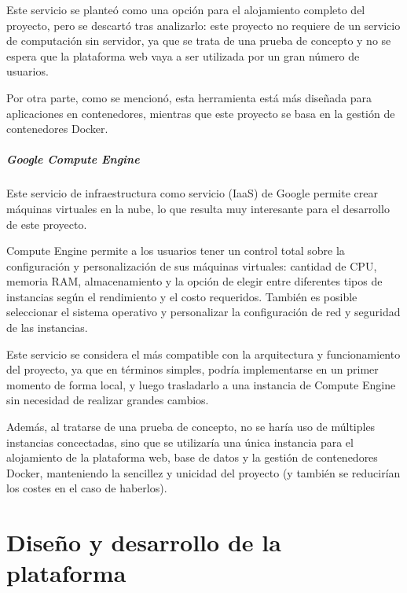                     Este servicio se planteó como una opción para el alojamiento completo del proyecto, pero se descartó tras analizarlo: este proyecto no requiere de un servicio de computación sin servidor, ya que se trata de una prueba de concepto y no se espera que la plataforma web vaya a ser utilizada por un gran número de usuarios.

                    Por otra parte, como se mencionó, esta herramienta está más diseñada para aplicaciones en contenedores, mientras que este proyecto se basa en la gestión de contenedores Docker.

                \paragraph{Google Compute Engine}

                    Este servicio de infraestructura como servicio (IaaS) de Google permite crear máquinas virtuales en la nube, lo que resulta muy interesante para el desarrollo de este proyecto.

                    Compute Engine permite a los usuarios tener un control total sobre la configuración y personalización de sus máquinas virtuales: cantidad de CPU, memoria RAM, almacenamiento y la opción de elegir entre diferentes tipos de instancias según el rendimiento y el costo requeridos. También es posible seleccionar el sistema operativo y personalizar la configuración de red y seguridad de las instancias.

                    Este servicio se considera el más compatible con la arquitectura y funcionamiento del proyecto, ya que en términos simples, podría implementarse en un primer momento de forma local, y luego trasladarlo a una instancia de Compute Engine sin necesidad de realizar grandes cambios.

                    Además, al tratarse de una prueba de concepto, no se haría uso de múltiples instancias concectadas, sino que se utilizaría una única instancia para el alojamiento de la plataforma web, base de datos y la gestión de contenedores Docker, manteniendo la sencillez y unicidad del proyecto (y también se reducirían los costes en el caso de haberlos).

                    \cleardoublepage



\chapter{Diseño y desarrollo de la plataforma}
    
